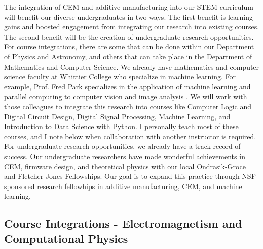 \documentclass[../../main.tex]{subfiles}
\begin{document}
The integration of CEM and additive manufacturing into our STEM curriculum will benefit our diverse undergraduates in two ways.  The first benefit is learning gains and boosted engagement from integrating our research into existing courses.  The second benefit will be the creation of undergraduate research opportunities.  For course integrations, there are some that can be done within our Department of Physics and Astronomy, and others that can take place in the Department of Mathematics and Computer Science.  We already have mathematics and computer science faculty at Whittier College who specialize in machine learning.  For example, Prof. Fred Park specializes in the application of machine learning and parallel computing to computer vision and image analysis \cite{SHI201528,doi:10.1137/20M1337041}.  We will work with those colleagues to integrate this research into courses like Computer Logic and Digital Circuit Design, Digital Signal Processing, Machine Learning, and Introduction to Data Science with Python.  I personally teach most of these courses, and I note below when collaboration with another instructor is required.  For undergraduate research opportunities, we already have a track record of success.  Our undergraduate researchers have made wonderful achievements in CEM, firmware design, and theoretical physics with our local Ondrasik-Groce and Fletcher Jones Fellowships.  Our goal is to expand this practice through NSF-sponsored research fellowhips in additive manufacturing, CEM, and machine learning.\\ \vspace{2.5mm}


\subsection{Course Integrations - Electromagnetism and Computational Physics}
\end{document}
